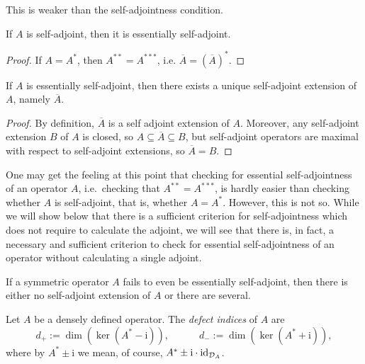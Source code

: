 This is weaker than the self-adjointness condition.

\begin{proposition}
If $A$ is self-adjoint, then it is essentially self-adjoint. 
\end{proposition}

\begin{proof}
  If $A = A^*$, then $A^{**}=A^{***}$, i.e.
  $\overline{A}=(\overline{A})^{*}$.
\end{proof}

\begin{theorem}
If $A$ is essentially self-adjoint, then there exists a unique self-adjoint extension of $A$, namely $\overline{A}$.
\end{theorem}

\begin{proof}
  By definition, \(\overline A\) is a self adjoint extension of \(A\).
  Moreover, any self-adjoint extension \(B\) of \(A\) is closed, so
  \(A\subseteq \overline A\subseteq B\), but self-adjoint operators
  are maximal with respect to self-adjoint extensions, so \(\overline
  A=B\).
\end{proof}

\begin{remark}
One may get the feeling at this point that checking for essential self-adjointness of an operator $A$, i.e.\ checking that $A^{**}=A^{***}$, is hardly easier than checking whether $A$ is self-adjoint, that is, whether $A=A^*$. However, this is not so. While we will show below that there is a sufficient criterion for self-adjointness which does not require to calculate the adjoint, we will see that there is, in fact, a necessary and sufficient criterion to check for essential self-adjointness of an operator without calculating a single adjoint.
\end{remark}

\begin{remark}
If a symmetric operator $A$ fails to even be essentially self-adjoint, then there is either no self-adjoint extension of $A$ or there are several. 
\end{remark}

\begin{definition}
Let $A$ be a densely defined operator. The \emph{defect indices} of $A$ are
\begin{equation*}
d_+:=\dim (\ker(A^*-\mathrm{i})) , \qquad \quad d_- :=\dim (\ker (A^*+\mathrm{i})),
\end{equation*}
where by $A^*\pm\mathrm{i}$ we mean, of course, $A^*\pm\mathrm{i}\cdot\operatorname{id}_{\mathcal{D}_A}$.
\end{definition}

